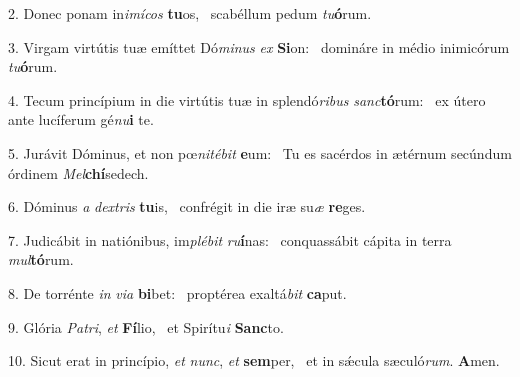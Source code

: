 2. Donec ponam in\textit{i}\textit{mí}\textit{cos} \textbf{tu}os, \ast\  scabéllum pedum \textit{tu}\textbf{ó}rum.\

3. Virgam virtútis tuæ emíttet Dó\textit{mi}\textit{nus} \textit{ex} \textbf{Si}on: \ast\  domináre in médio inimicórum \textit{tu}\textbf{ó}rum.\

4. Tecum princípium in die virtútis tuæ in splendó\textit{ri}\textit{bus} \textit{sanc}\textbf{tó}rum: \ast\  ex útero ante lucíferum gé\textit{nu}\textbf{i} te.\

5. Jurávit Dóminus, et non pœ\textit{ni}\textit{té}\textit{bit} \textbf{e}um: \ast\  Tu es sacérdos in ætérnum secúndum órdinem \textit{Mel}\textbf{chí}sedech.\

6. Dóminus \textit{a} \textit{dex}\textit{tris} \textbf{tu}is, \ast\  confrégit in die iræ su\textit{æ} \textbf{re}ges.\

7. Judicábit in natiónibus, im\textit{plé}\textit{bit} \textit{ru}\textbf{í}nas: \ast\  conquassábit cápita in terra \textit{mul}\textbf{tó}rum.\

8. De torrénte \textit{in} \textit{vi}\textit{a} \textbf{bi}bet: \ast\  proptérea exaltá\textit{bit} \textbf{ca}put.\

9. Glória \textit{Pa}\textit{tri}, \textit{et} \textbf{Fí}lio, \ast\  et Spirítu\textit{i} \textbf{Sanc}to.\

10. Sicut erat in princípio, \textit{et} \textit{nunc}, \textit{et} \textbf{sem}per, \ast\  et in sǽcula sæculó\textit{rum}. \textbf{A}men.\

